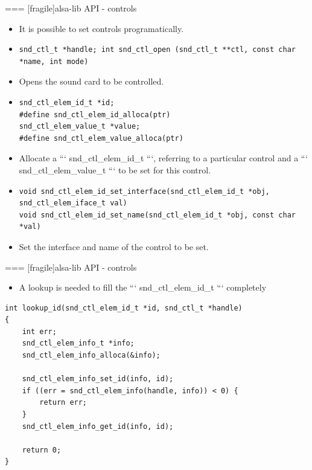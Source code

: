 === [fragile]{alsa-lib API - controls}
  \begin{itemize}
  \item It is possible to set controls programatically.
  \item
    \begin{block}{}
    \fontsize{9}{9}\selectfont
      \begin{verbatim}
snd_ctl_t *handle; int snd_ctl_open (snd_ctl_t **ctl, const char *name, int mode)
      \end{verbatim}
    \end{block}
    \item Opens the sound card to be controlled.
  \item
    \begin{block}{}
    \fontsize{9}{9}\selectfont
      \begin{verbatim}
snd_ctl_elem_id_t *id;
#define snd_ctl_elem_id_alloca(ptr)
snd_ctl_elem_value_t *value;
#define snd_ctl_elem_value_alloca(ptr)
      \end{verbatim}
    \end{block}
  \item Allocate a ``` snd_ctl_elem_id_t ```, referring to a particular
    control and a ``` snd_ctl_elem_value_t ``` to be set for this
    control.
  \item
    \begin{block}{}
    \fontsize{9}{9}\selectfont
      \begin{verbatim}
void snd_ctl_elem_id_set_interface(snd_ctl_elem_id_t *obj, snd_ctl_elem_iface_t val)
void snd_ctl_elem_id_set_name(snd_ctl_elem_id_t *obj, const char *val)
      \end{verbatim}
    \end{block}
    \item Set the interface and name of the control to be set.
  \end{itemize}


=== [fragile]{alsa-lib API - controls}
  \begin{itemize}
  \item A lookup is needed to fill the ``` snd_ctl_elem_id_t ```
    completely
  \end{itemize}
  \begin{block}{}
    \fontsize{9}{9}\selectfont
    \begin{verbatim}
int lookup_id(snd_ctl_elem_id_t *id, snd_ctl_t *handle)
{
    int err;
    snd_ctl_elem_info_t *info;
    snd_ctl_elem_info_alloca(&info);

    snd_ctl_elem_info_set_id(info, id);
    if ((err = snd_ctl_elem_info(handle, info)) < 0) {
        return err;
    }
    snd_ctl_elem_info_get_id(info, id);

    return 0;
}
    \end{verbatim}
  \end{block}


